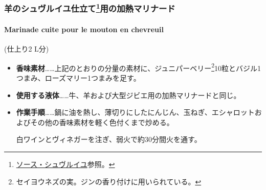 \begin{recette}
\maeaki

\hypertarget{ux7f8aux306eux30b7ux30e5ux30f4ux30ebux30a4ux30e6ux4ed5ux7acbux30666ux7528ux306eux52a0ux71b1ux30deux30eaux30caux30fcux30c9}{%
\subsubsection[羊のシュヴルイユ仕立て用の加熱マリナード]{\texorpdfstring{羊のシュヴルイユ仕立て\footnote{\protect\hyperlink{sauce-chevreuil}{ソース・シュヴルイユ}参照。}用の加熱マリナード}{羊のシュヴルイユ仕立て用の加熱マリナード}}\label{ux7f8aux306eux30b7ux30e5ux30f4ux30ebux30a4ux30e6ux4ed5ux7acbux30666ux7528ux306eux52a0ux71b1ux30deux30eaux30caux30fcux30c9}}

\hypertarget{marinade-cuite-pour-le-mouton-en-chevreuil}{%
\paragraph{Marinade cuite pour le mouton en
chevreuil}\label{marinade-cuite-pour-le-mouton-en-chevreuil}}


(仕上り2 L分)

\begin{itemize}
\item
  \textbf{香味素材}\ldots{}\ldots{}上記のとおりの分量の素材に、ジュニパーベリー\footnote{セイヨウネズの実。ジンの香り付けに用いられている。}10粒とバジル1つまみ、ローズマリー1つまみを足す。
\item
  \textbf{使用する液体}\ldots{}\ldots{}牛、羊および大型ジビエ用の加熱マリナードと同じ。
\item
  \textbf{作業手順}\ldots{}\ldots{}鍋に油を熱し、薄切りにしたにんじん、玉ねぎ、エシャロットおよびその他の香味素材を軽く色付くまで炒める。

  白ワインとヴィネガーを注ぎ、弱火で約30分間火を通す。
\end{itemize}

\maeaki

\hypertarget{ux7f8aux306eux30b7ux30e3ux30e2ux30efux4ed5ux7acbux30668ux7528ux306eux52a0ux71b1ux30deux30eaux30caux30fcux30c9}{%
}
\end{recette}
